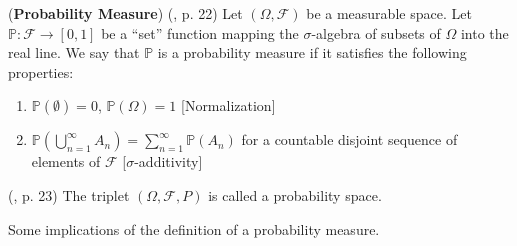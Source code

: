 \documentclass[11pt]{article} %
\begin{document}
\begin{definition} (\textbf{Probability Measure}) (\cite{Billingsley95}, p. 22) Let $(\Omega, \mathcal{F})$ be a measurable space. Let $\mathbb{P}: \mathcal{F} \rightarrow [0,1]$ be a ``set'' function mapping the $\sigma$-algebra of subsets of $\Omega$ into the real line. We say that $\mathbb{P}$ is a probability measure if it satisfies the following properties:
\begin{enumerate}
	\item $\mathbb{P}(\emptyset)=0$, $\mathbb{P}(\Omega)=1$ [Normalization]
	\item $\mathbb{P}(\bigcup_{n=1}^{\infty} A_n)= \sum_{n=1}^{\infty} \mathbb{P}(A_n)$ for a countable disjoint sequence of elements of $\mathcal{F}$ [$\sigma$-additivity]\\
\end{enumerate}
\end{definition}


\begin{definition} (\cite{Billingsley95}, p. 23)
The triplet $(\Omega, \mathcal{F}, P)$ is called a probability space. 
\end{definition}

Some implications of the definition of a probability measure. 
\end{document}
